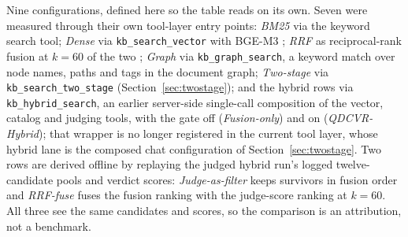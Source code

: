 Nine configurations, defined here so the table reads on its own. Seven were
measured through their own tool-layer entry points: \emph{BM25} via the
keyword search tool; \emph{Dense} via \texttt{kb\_search\_vector} with
BGE-M3 \cite{bge-m3}; \emph{RRF} as reciprocal-rank fusion at $k=60$ of the
two \cite{rrf-cormack}; \emph{Graph} via \texttt{kb\_graph\_search}, a
keyword match over node names, paths and tags in the document graph;
\emph{Two-stage} via
\texttt{kb\_search\_two\_stage} (Section~\ref{sec:twostage}); and the hybrid
rows via \texttt{kb\_hybrid\_search}, an earlier server-side single-call
composition of the vector, catalog and judging tools, with the gate off
(\emph{Fusion-only}) and on (\emph{QDCVR-Hybrid}); that wrapper is no longer
registered in the current tool layer, whose hybrid lane is the composed chat
configuration of Section~\ref{sec:twostage}. Two rows are derived offline by replaying the judged hybrid
run's logged twelve-candidate pools and verdict scores:
\emph{Judge-as-filter} keeps survivors in fusion order and \emph{RRF-fuse}
fuses the fusion ranking with the judge-score ranking at $k=60$. All three
see the same candidates and scores, so the comparison is an attribution,
not a benchmark.

